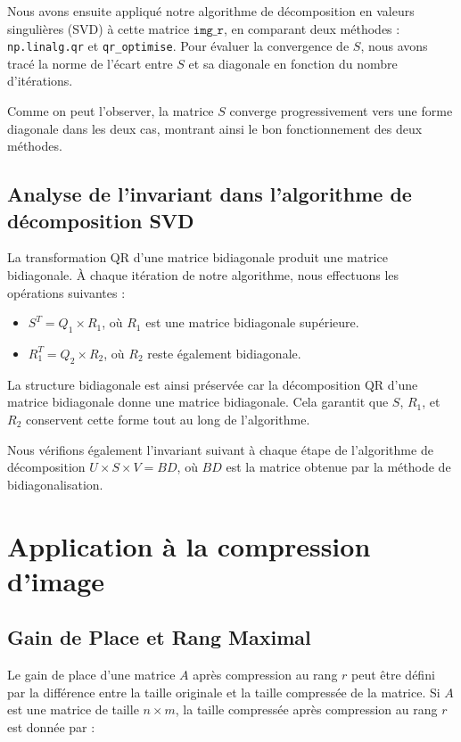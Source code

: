\documentclass{article}
\begin{document}
Nous avons ensuite appliqué notre algorithme de décomposition en valeurs singulières (SVD) à cette matrice \( \texttt{img\_r} \), en comparant deux méthodes : \texttt{np.linalg.qr} et \texttt{qr\_optimise}. Pour évaluer la convergence de \( S \), nous avons tracé la norme de l'écart entre \( S \) et sa diagonale en fonction du nombre d'itérations.  

Comme on peut l'observer, la matrice \( S \) converge progressivement vers une forme diagonale dans les deux cas, montrant ainsi le bon fonctionnement des deux méthodes.  

\subsection{Analyse de l'invariant dans l'algorithme de décomposition SVD}

La transformation QR d'une matrice bidiagonale produit une matrice bidiagonale. À chaque itération de notre algorithme, nous effectuons les opérations suivantes :
\begin{itemize}
    \item \( S^T = Q_1 \times R_1 \), où \( R_1 \) est une matrice bidiagonale supérieure.
    \item \( R_1^T = Q_2 \times R_2 \), où \( R_2 \) reste également bidiagonale.
\end{itemize}

La structure bidiagonale est ainsi préservée car la décomposition QR d'une matrice bidiagonale donne une matrice bidiagonale. Cela garantit que \( S \), \( R_1 \), et \( R_2 \) conservent cette forme tout au long de l'algorithme.

Nous vérifions également l'invariant suivant à chaque étape de l'algorithme de décomposition \( U \times S \times V = BD \), où \( BD \) est la matrice obtenue par la méthode de bidiagonalisation.


\section{Application à la compression d'image}



\subsection{Gain de Place et Rang Maximal}
Le gain de place d'une matrice \( A \) après compression au rang \( r \) peut être défini par la différence entre la taille originale et la taille compressée de la matrice. Si \( A \) est une matrice de taille \( n \times m \), la taille compressée après compression au rang \( r \) est donnée par :
\end{document}
